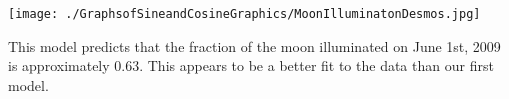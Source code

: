 \documentclass{ximera}
\begin{document}
\begin{enumerate}
\begin{enumerate}
\begin{center}

 \texttt{[image: ./GraphsofSineandCosineGraphics/MoonIlluminatonDesmos.jpg]} 

\end{center}

This model predicts that the fraction of the moon illuminated on June 1st, 2009 is approximately $0.63$.  This appears to be a better fit to the data than our first model.

\end{enumerate}


\end{enumerate}
\end{document}
